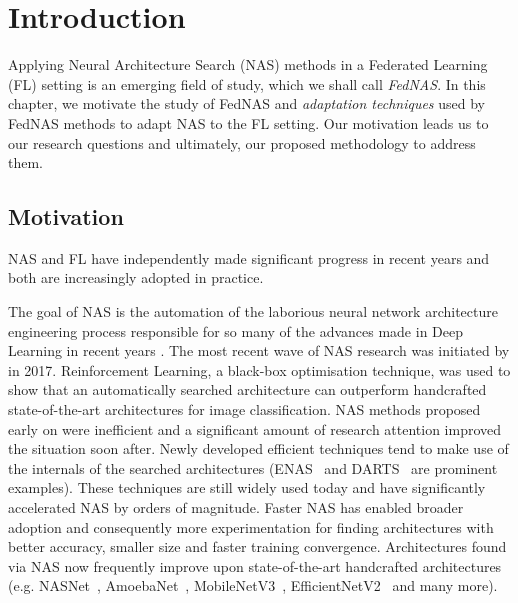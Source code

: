 \chapter{Introduction}\label{chapter:introduction}

Applying Neural Architecture Search (NAS) methods in a Federated Learning (FL) setting is an emerging field of study, which we shall call \textit{FedNAS}. In this chapter, we motivate the study of FedNAS and \textit{adaptation techniques} used by FedNAS methods to adapt NAS to the FL setting. Our motivation leads us to our research questions and ultimately, our proposed methodology to address them.

\section{Motivation}

NAS and FL have independently made significant progress in recent years and both are increasingly adopted in practice. 

The goal of NAS is the automation of the laborious neural network architecture engineering process responsible for so many of the advances made in Deep Learning in recent years \cite{nas_survey_2019}. The most recent wave of NAS research was initiated by \cite{nas_with_rl_2017} in 2017. Reinforcement Learning, a black-box optimisation technique, was used to show that an automatically searched architecture can outperform handcrafted state-of-the-art architectures for image classification. NAS methods proposed early on were inefficient and a significant amount of research attention improved the situation soon after. Newly developed efficient techniques tend to make use of the internals of the searched architectures (ENAS~\cite{enas_2018} and DARTS~\cite{darts_2019} are prominent examples). These techniques are still widely used today and have significantly accelerated NAS by orders of magnitude. Faster NAS has enabled broader adoption and consequently more experimentation for finding architectures with better accuracy, smaller size and faster training convergence. Architectures found via NAS now frequently improve upon state-of-the-art handcrafted architectures (e.g. NASNet~\cite{nasnet_2018}, AmoebaNet~\cite{amoebanet_2019}, MobileNetV3~\cite{mobilenetv3_2019}, EfficientNetV2~\cite{efficientnetv2_2021} and many more).

